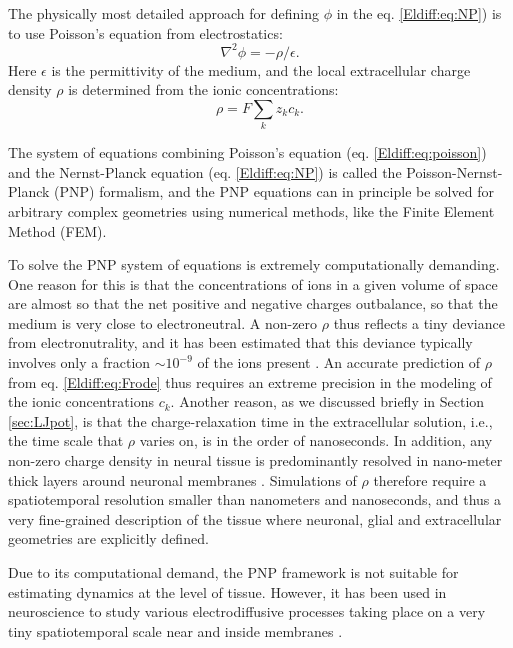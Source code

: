 \subsubsection{}
The physically most detailed approach for defining $\phi$ in the eq. \ref{Eldiff:eq:NP}) is to use Poisson's equation from electrostatics:
\begin{equation}
\nabla^2 \phi = -\rho/\epsilon.
\label{Eldiff:eq:poisson}
\end{equation}
Here $\epsilon$ is the permittivity of the medium, and the local extracellular charge density $\rho$ is determined from the ionic concentrations: 
\begin{equation}
\rho = F \sum_k z_k c_k.
\label{Eldiff:eq:Frode}
\end{equation}

The system of equations combining Poisson's equation (eq. \ref{Eldiff:eq:poisson}) and the Nernst-Planck equation (eq. \ref{Eldiff:eq:NP})
is called the Poisson-Nernst-Planck (PNP) formalism, and the PNP equations can in principle be solved for arbitrary complex geometries using numerical methods, like the Finite Element Method (FEM). 

To solve the PNP system of equations is extremely computationally demanding. One reason for this is that the concentrations of ions in a given volume of space are almost so that the net positive and negative charges outbalance, so that the medium is very close to electroneutral. A non-zero $\rho$ thus reflects a tiny deviance from electronutrality, and it has been estimated that this deviance typically involves only a fraction $\sim 10^{-9}$ of the ions present \cite{Aguilella1986}. An accurate prediction of $\rho$ from eq. \ref{Eldiff:eq:Frode} thus requires an extreme precision in the modeling of the ionic concentrations $c_k$. Another reason, as we discussed briefly in Section \ref{sec:LJpot}, is that the charge-relaxation time in the extracellular solution, i.e., the time scale that $\rho$ varies on, is in the order of nanoseconds. In addition, any non-zero charge density in neural tissue is predominantly resolved in nano-meter thick layers around neuronal membranes \cite{Grodzinsky2011, Gratiy2017}. Simulations of $\rho$ therefore require a spatiotemporal resolution smaller than nanometers and nanoseconds, and thus a very fine-grained description of the tissue where neuronal, glial and extracellular geometries are explicitly defined.

Due to its computational demand, the PNP framework is not suitable for estimating dynamics at the level of tissue. However, it has been used in neuroscience to study various electrodiffusive processes taking place on a very tiny spatiotemporal scale near and inside membranes \cite{Leonetti1998, Leonetti2004, Lu2007, Lopreore2008, Nanninga2008, Pods2013, Gardner2015}. 


